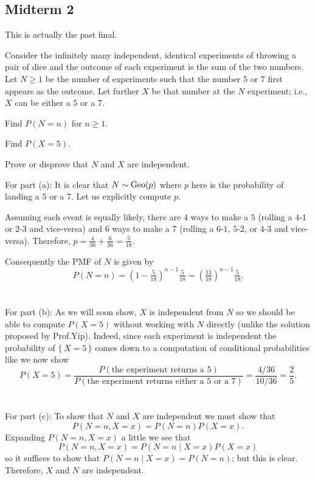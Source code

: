 \subsection{Midterm 2}
This is actually the past final.
\begin{problem}
  Consider the infinitely many independent, identical experiments of
  throwing a pair of dice and the outcome of each experiment is the sum of
  the two numbers. Let \(N\geq 1\) be the number of experiments such that
  the number \(5\) or \(7\) first appears as the outcome. Let further \(X\)
  be that number at the \(N\) experiment; i.e., \(X\) can be
  either a \(5\) or a \(7\).
  \begin{alphlist}
  \item Find \(P(N=n)\) for \(n\geq 1\).
  \item Find \(P(X=5)\).
  \item Prove or disprove that \(N\) and \(X\) are independent.
  \end{alphlist}
\end{problem}
\begin{solution*}
  For part (a): It is clear that \(N\sim\operatorname{Geo}(p)\) where \(p\) here is the
  probability of landing a \(5\) or a \(7\). Let us explicitly compute
  \(p\).

  Assuming each event is equally likely, there are \(4\) ways to make a
  \(5\) (rolling a \(4\)-\(1\) or \(2\)-\(3\) and vice-versa) and \(6\)
  ways to make a \(7\) (rolling a \(6\)-\(1\), \(5\)-\(2\), or \(4\)-\(3\)
  and vice-versa). Therefore,
  \(p=\frac{4}{36}+\frac{6}{36}=\frac{5}{18}\).

  Consequently the PMF of \(N\) is given by
  \[
    P(N=n)=\left(1-\tfrac{5}{18}\right)^{n-1}\tfrac{5}{18}
    =\left(\tfrac{13}{18}\right)^{n-1}\tfrac{5}{18}.
  \]
  \\\\
  For part (b): As we will soon show, \(X\) is independent from \(N\) so we
  should be able to compute \(P(X=5)\) without working with \(N\) directly
  (unlike the solution proposed by Prof.\@ Yip). Indeed, since each
  experiment is independent the probability of \(\{\,X=5\,\}\) comes down
  to a computation of conditional probabilities like we now show
  \[
    P(X=5)=\frac{P(\text{the experiment returns a \(5\)})}
    {P(\text{the experiment returns either a \(5\) or a \(7\)})}
    =\frac{4/36}{10/36}=\frac{2}{5}.
  \]
  \\\\
  For part (c): To show that \(N\) and \(X\) are independent we must show
  that
  \[
    P(N=n,X=x)=P(N=n)P(X=x).
  \]
  Expanding \(P(N=n,X=x)\) a little we see that
  \[
    P(N=n,X=x)=P(N=n\mid X=x)P(X=x)
  \]
  so it suffices to show that \(P(N=n\mid X=x)=P(N=n)\); but this is
  clear. Therefore, \(X\) and \(N\) are independent.
\end{solution*}

